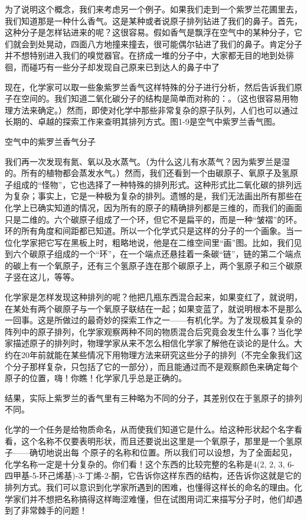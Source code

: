 \documentclass[12pt,oneside]{book}
\begin{document}
为了说明这个概念，我们来考虑另一个例子。如果我们走到一个紫罗兰花圃里去，我们知道那是一种什么香气。这是某种或者说原子排列钻进了我们的鼻子。首先，这种分子是怎样钻进来的呢？这很容易。假如香气是飘浮在空气中的某种分子，它们就会到处晃动，四面八方地撞来撞去，很可能偶尔钻进了我们的鼻子。肯定分子并不想特别进入我们的嗅觉器官。在挤成一堆的分子中，大家都无目的地到处徘徊，而碰巧有一些分子却发现自己原来已到达人的鼻子中了

现在，化学家可以取一些象紫罗兰香气这样特殊的分子进行分析，然后告诉我们原子在空间的。我们知道二氧化碳分子的结构是简单而对称的：。（这也很容易用物理方法来确定。）然而，即使对化学中那些非常复杂的原子队列，人们也可以通过长期的、卓越的探索工作来查明其排列方式。图1-9是空气中紫罗兰香气图。
\begin{fig}{空气中的紫罗兰香气分子}
\caption{空气中的紫罗兰香气分子}
\label{fig:空气中的紫罗兰香气分子}
\end{fig}
我们再一次发现有氮、氧以及水蒸气。（为什么这儿有水蒸气？因为紫罗兰是湿的。所有的植物都会蒸发水气。）然而，我们还看到一个由碳原子、氧原子及氢原子组成的“怪物”，它也选择了一种特殊的排列形式。这种形式比二氧化碳的排列远为复杂；事实上，它是一种极为复杂的排列。遗憾的是，我们无法画出所有那些在化学上已确实知道的情况，因为所有的原子的精确排列都是三维的，而我们的画面只是二维的。六个碳原子组成了一个环，但它不是扁平的，而是一种“皱褶”的环。环的所有角度和间距都已知道。所以一个化学式只是这样的分子的一个画象。当一位化学家把它写在黑板上时，粗略地说，他是在二维空间里“画”图。比如，我们见到六个碳原子组成的一个“环”，在一个端点还悬挂着一条碳“链”，链的第二个端点的碳上有一个氧原子，还有三个氢原子连在那个碳原子上，两个氢原子和三个碳原子竖在这儿，等等。

化学家是怎样发现这种排列的呢？他把几瓶东西混合起来，如果变红了，就说明，在某处有两个碳原子与一个氧原子联结在一起；如果变蓝了，就说明根本不是那么一回事。这是所做过的最奇妙的探索工作之一——有机化学。为了发现极其复杂的阵列中的原子排列，化学家观察两种不同的物质混合后究竟会发生什么事？当化学家描述原子的排列时，物理学家从来不怎么相信化学家了解他在谈论的是什么。大约在20年前就能在某些情况下用物理方法来研究这些分子的排列（不完全象我们这个分子那样复杂，只包括了它的一部分），而且能通过而不是观察颜色来确定每个原子的位置，嗨！你瞧！化学家几乎总是正确的。

结果，实际上紫罗兰的香气里有三种略为不同的分子，其差别仅在于氢原子的排列不同。

化学的一个任务是给物质命名，从而使我们知道它是什么。给这种形状起个名字看看，这个名称不仅要表明形状，而且还要说出这里是一个氧原子，那里是一个氢原子——确切地说出每 个原子的名称和位置。所以我们可以设想，为了全面起见，化学名称一定是十分复杂的。你们看！这个东西的比较完整的名称是4(2, 2, 3, 6-四甲基-5-环己烯基)-3-丁烯-2-酮，它告诉你这样东西的结构，还告诉你这就是它的排列方式。我们可以意识到化学家所遇到的困难，也懂得这样长的命名的理由。化学家们并不想把名称搞得这样晦涩难懂，但在试图用词汇来描写分子时，他们却遇到了非常棘手的问题！
\end{document}
